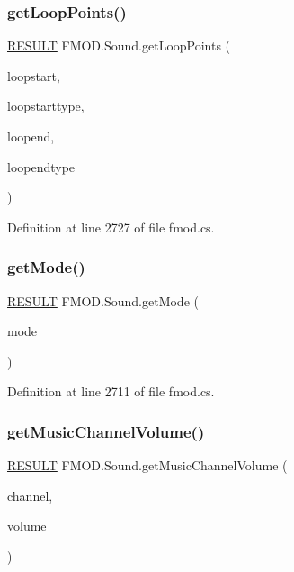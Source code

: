 \subsubsection{\texorpdfstring{get\+Loop\+Points()}{getLoopPoints()}}
{\footnotesize\ttfamily \hyperlink{namespace_f_m_o_d_a305d1176ef3f8c8815861a60407ac33d}{R\+E\+S\+U\+LT} F\+M\+O\+D.\+Sound.\+get\+Loop\+Points (\begin{DoxyParamCaption}\item[{out uint}]{loopstart,  }\item[{\hyperlink{namespace_f_m_o_d_aff20975332f93ff2180d2681cb43929f}{T\+I\+M\+E\+U\+N\+IT}}]{loopstarttype,  }\item[{out uint}]{loopend,  }\item[{\hyperlink{namespace_f_m_o_d_aff20975332f93ff2180d2681cb43929f}{T\+I\+M\+E\+U\+N\+IT}}]{loopendtype }\end{DoxyParamCaption})}



Definition at line 2727 of file fmod.\+cs.

\mbox{\label{class_f_m_o_d_1_1_sound_ae8960b4893c57a1cdc897544d3dbc1ca}} 
\subsubsection{\texorpdfstring{get\+Mode()}{getMode()}}
{\footnotesize\ttfamily \hyperlink{namespace_f_m_o_d_a305d1176ef3f8c8815861a60407ac33d}{R\+E\+S\+U\+LT} F\+M\+O\+D.\+Sound.\+get\+Mode (\begin{DoxyParamCaption}\item[{out \hyperlink{namespace_f_m_o_d_a94ab158a8314f5f4248f1aea55dbefa3}{M\+O\+DE}}]{mode }\end{DoxyParamCaption})}



Definition at line 2711 of file fmod.\+cs.

\mbox{\label{class_f_m_o_d_1_1_sound_ab6f8e4d494d029a7b7149123af9be438}} 
\subsubsection{\texorpdfstring{get\+Music\+Channel\+Volume()}{getMusicChannelVolume()}}
{\footnotesize\ttfamily \hyperlink{namespace_f_m_o_d_a305d1176ef3f8c8815861a60407ac33d}{R\+E\+S\+U\+LT} F\+M\+O\+D.\+Sound.\+get\+Music\+Channel\+Volume (\begin{DoxyParamCaption}\item[{int}]{channel,  }\item[{out float}]{volume }\end{DoxyParamCaption})}



